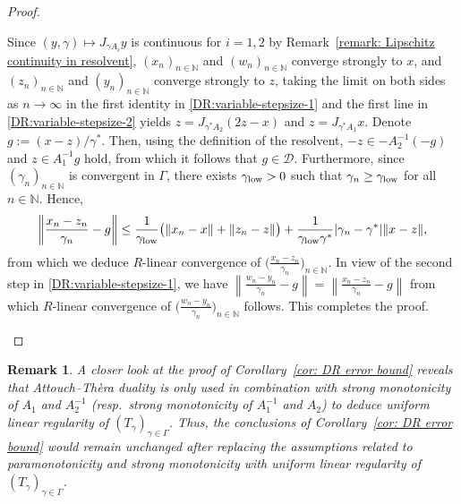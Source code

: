 \documentclass[a4paper,12pt]{article}
\newtheorem{remark}[theorem]{Remark}
\begin{document}
\begin{proof}
\begin{enumerate}[(\ref{cor:fixed-point-convergence})]
Since $(y,\gamma)\mapsto J_{\gamma A_i}y$ is continuous for $i=1,2$ by Remark~\ref{remark: Lipschitz continuity in resolvent},  $(x_n)_{n\in\mathbb{N}}$ and  $(w_n)_{n\in\mathbb{N}}$ converge strongly to $x$, and $(z_n)_{n\in\mathbb{N}}$ and $(y_n)_{n\in\mathbb{N}}$ converge strongly to $z$,  taking the limit on both sides as $n\to\infty$ in the first identity in \eqref{DR:variable-stepsize-1} and the first line in \eqref{DR:variable-stepsize-2} yields $z=J_{\gamma^*A_2}(2z-x)$ and $z=J_{\gamma^*A_1}x$. Denote $g:=(x-z)/\gamma^*$. Then, using the definition of the resolvent,  $-z\in -A_2^{-1}(-g)$ and $z\in A_1^{-1}g$ hold, from which it follows that $g\in\mathcal{D}$.
Furthermore, since $(\gamma_n)_{n \in \mathbb{N}}$ is convergent in $\Gamma$, there exists $\gamma_{\rm low} >0$ such that $\gamma_n \geq \gamma_{\rm low}$ for all $n \in \mathbb{N}$. Hence, 
\begin{equation*}
    \left\|\frac{x_n - z_n}{\gamma_n} - g\right\| \leq \frac{1}{\gamma_{\rm low}}\bigl(\|x_n -x\| + \|z_n - z\|\bigr) +  \frac{1}{\gamma_{\rm low}\gamma^*}|\gamma_n - \gamma^*| \|x - z\|, 
\end{equation*}
from which we deduce $R$-linear convergence of $\bigl(\frac{x_n - z_n}{\gamma_n}\bigr)_{n\in\mathbb{N}}$. In view of the second step in \eqref{DR:variable-stepsize-1}, we have $\left\|\frac{w_n - y_n}{\gamma_n} - g \right\| = \left\|\frac{x_n - z_n}{\gamma_n} - g \right\|$ from which $R$-linear convergence of  $\bigl(\frac{w_n - y_n}{\gamma_n}\bigr)_{n\in\mathbb{N}}$ follows. This completes the proof.%
\end{enumerate}  
\end{proof}

\begin{remark}
A closer look at the proof of Corollary~\ref{cor: DR error bound} reveals that Attouch--Th\`era duality is only used in combination with strong monotonicity of $A_1$ and $A_2^{-1}$ (resp.\ strong monotonicity of $A_1^{-1}$ and $A_2$) to deduce uniform linear regularity of $(T_{\gamma})_{\gamma\in\Gamma}$. Thus, the conclusions of Corollary~\ref{cor: DR error bound} would remain unchanged after replacing the assumptions related to paramonotonicity and strong monotonicity with uniform linear regularity of $(T_{\gamma})_{\gamma\in\Gamma}$.
\end{remark}
\end{document}
